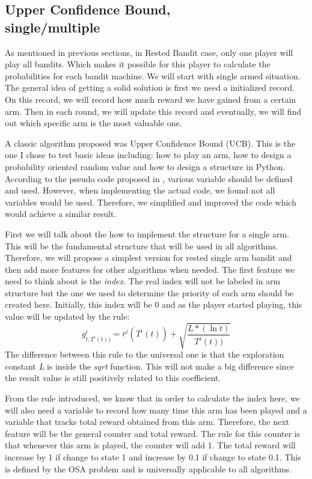 \documentclass{article}
\begin{document}
\subsection{Upper Confidence Bound,\\single/multiple}
As mentioned in previous sections, in Rested Bandit case, only one player will play all bandits. Which makes it possible for this player to calculate the probabilities for each bandit machine. We will start with single armed situation. The general idea of getting a solid solution is first we need a initialized record. On this record, we will record how much reward we have gained from a certain arm. Then in each round, we will update this record and eventually, we will find out which specific arm is the most valuable one.

A classic algorithm proposed was Upper Confidence Bound (UCB)\cite{ucb}. This is the one I chose to test basic ideas including: how to play an arm, how to design a probability oriented random value and how to design a structure in Python. According to the pseudo code proposed in \cite{6200864}, various variable should be defined and used. However, when implementing the actual code, we found not all variables would be used. Therefore, we simplified and improved the code which would achieve a similar result. 

First we will talk about the how to implement the structure for a single arm. This will be the fundamental structure that will be used in all algorithms. Therefore, we will propose a simplest version for rested single arm bandit and then add more features for other algorithms when needed. The first feature we need to think about is the \textit{index}. The real index will not be labeled in arm structure but the one we used to determine the priority of each arm should be created here. Initially, this index will be 0 and as the player started playing, this value will be updated by the rule\cite{6200864}: $$g_{t, T^{i}(t))}^{i} = \bar{r}^{i}(T^{i}(t))+\sqrt{\frac{L*(\ln t)}{T^i(t))}}$$The difference between this rule to the universal one is that the exploration constant \textit{L}\cite{ucb} is inside the \textit{sqrt} function. This will not make a big difference since the result value is still positively related to this coefficient.

From the rule introduced, we know that in order to calculate the index here, we will also need a variable to record how many time this arm has been played and a variable that tracks total reward obtained from this arm. Therefore, the next feature will be the general counter and total reward. The rule for this counter is that whenever this arm is played, the counter will add 1. The total reward will increase by 1 if change to state 1 and increase by 0.1 if change to state 0.1. This is defined by the OSA problem and is universally applicable to all algorithms.
\end{document}
